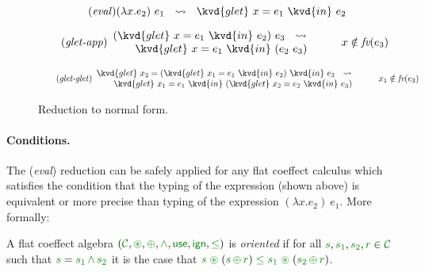 
\begin{figure}[t]

\begin{equation*}
\tag{\emph{eval}}
(\lambda x.e_2)~e_1 ~~\leadsto~~ \kvd{glet}~x=e_1~\kvd{in}~e_2
\end{equation*}

\begin{equation*}
\tag{\emph{glet-app}}
\begin{array}{l}
  (\kvd{glet}~x=e_1~\kvd{in}~e_2)~e_3  ~~\leadsto~~\\ \qquad \kvd{glet}~x=e_1~\kvd{in}~(e_2~e_3)
\end{array}
\qquad x \notin \textit{fv}(e_3)\qquad
\end{equation*}

\begin{equation*}
\tag{\emph{glet-glet}}
\begin{array}{l}
  \kvd{glet}~x_2=(\kvd{glet}~x_1 = e_1~\kvd{in}~e_2)~\kvd{in}~e_3  ~~\leadsto~~\\
  \qquad \kvd{glet}~x_1=e_1~\kvd{in}~(\kvd{glet}~x_2=e_2~\kvd{in}~e_3)
\end{array}
\qquad x_1 \notin \textit{fv}(e_3)\qquad
\end{equation*}

\caption{Reduction to normal form.}
\label{fig:flat-normal-form}
\end{figure}


\paragraph{Conditions.}
The (\emph{eval}) reduction can be safely applied for any flat coeffect calculus which satisfies the
condition that the typing of the  expression (shown above) is equivalent or more precise
than typing of the expression $(\lambda x.e_2)~e_1$. More formally:

\begin{definition}
A flat coeffect algebra $(\C, \cseq, \cpar, \czip, \cunit, \czero, \cleq)$ is \emph{oriented} if for all
$\cclrd{s}, \cclrd{s_1}, \cclrd{s_2}, \cclrd{r} \in \C$ such that $\cclrd{s}=\cclrd{s_1}\,\czip\,\cclrd{s_2}$
it is the case that $\cclrd{s} \;\cseq\; (\cclrd{s} \,\cpar\, \cclrd{r}) \;\cleq\; \cclrd{s_1} \;\cseq\; (\cclrd{s_2} \,\cpar\, \cclrd{r})$.
\end{definition}

